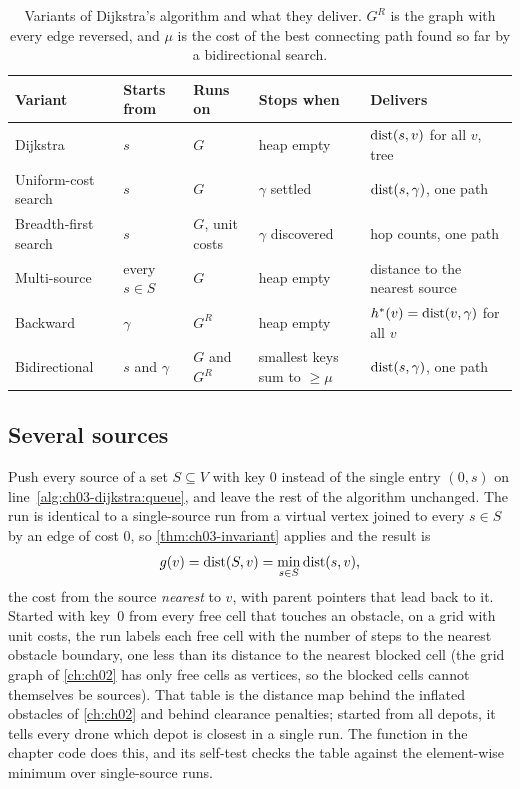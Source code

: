 \begin{table}[tb]
  \centering\small
  \caption{Variants of Dijkstra's algorithm and what they deliver. $G^{R}$ is the graph with
every edge reversed, and $\mu$ is the cost of the best connecting path found so far by a
bidirectional search.}
  \label{tab:ch03-variants}
  \begin{tabular}{@{}lllL{3.1cm}L{3.7cm}@{}}
  \toprule
  Variant & Starts from & Runs on & Stops when & Delivers\\
  \midrule
  Dijkstra & $s$ & $G$ & heap empty & $\operatorname{dist}(s,v)$ for all $v$, tree\\
  Uniform-cost search & $s$ & $G$ & $\gamma$ settled & $\operatorname{dist}(s,\gamma)$, one path\\
  Breadth-first search & $s$ & $G$, unit costs & $\gamma$ discovered & hop counts, one path\\
  Multi-source & every $s\in S$ & $G$ & heap empty & distance to the nearest source\\
  Backward & $\gamma$ & $G^{R}$ & heap empty & $h^*(v)=\operatorname{dist}(v,\gamma)$ for all $v$\\
  Bidirectional & $s$ and $\gamma$ & $G$ and $G^{R}$ & smallest keys sum to $\ge\mu$ & $\operatorname{dist}(s,\gamma)$, one path\\
  \bottomrule
  \end{tabular}
\end{table}

\subsection{Several sources}
\label{sec:ch03-multisource}
%
Push every source of a set $S\subseteq V$ with key 0 instead of the single entry $(0,s)$ on
line~\ref{alg:ch03-dijkstra:queue}, and leave the rest of the algorithm unchanged. The run is
identical to a single-source run from a virtual vertex joined to every $s\in S$ by an edge of
cost 0, so \cref{thm:ch03-invariant} applies and the result is
\[
g(v)=\operatorname{dist}(S,v)=\min_{s\in S}\operatorname{dist}(s,v),
\]
the cost from the source \emph{nearest} to $v$, with parent pointers that lead back to it.
Started with key~0 from every free cell that touches an obstacle, on a grid with unit costs,
the run labels each free cell with the number of steps to the nearest obstacle boundary, one
less than its distance to the nearest blocked cell (the grid graph of \cref{ch:ch02} has only
free cells as vertices, so the blocked cells cannot themselves be sources). That table is the
distance map behind
the inflated obstacles of \cref{ch:ch02} and behind clearance penalties; started from all depots, it tells every drone
which depot is closest in a single run. The function  in the
chapter code does this, and its self-test checks the table against the element-wise minimum
over single-source runs.

